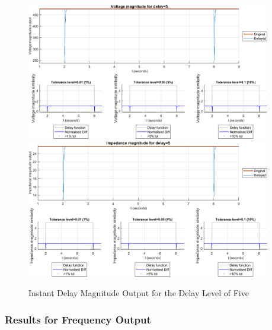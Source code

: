 \begin{figure}
    \caption{Instant Delay Magnitude Output for the Delay Level of Five}
    \includegraphics[width=0.95\textwidth]{PMUsim-figures/DelayOf_5/Instant_vMagnitude.png}    
      \includegraphics[width=0.95\textwidth]{PMUsim-figures/DelayOf_5/Instant_iMagnitude.png}     
    \label{fig:PMUsim_Five_Magnitude}
    \begin{small}
     \end{small}
\end{figure}

\newpage \subsubsection{Results for Frequency Output}


